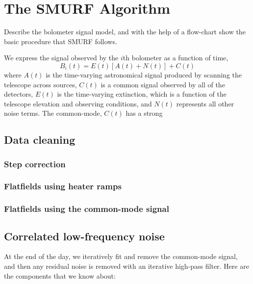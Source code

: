 \documentclass[useAMS,usenatbib,usegraphicx,nofootinbib]{mn2e}
\begin{document}
\section{The SMURF Algorithm}
\label{sec:data}

Describe the bolometer signal model, and with the help of a flow-chart
show the basic procedure that SMURF follows.

We express the signal observed by the $i$th bolometer as a function of time,
\begin{equation}
B_i(t) = E(t)[ A(t) + N(t) ] + C(t)
\end{equation}
where $A(t)$ is the time-varying astronomical signal produced by
scanning the telescope across sources, $C(t)$ is a common signal
observed by all of the detectors, $E(t)$ is the time-varying
extinction, which is a function of the telescope elevation and
observing conditions, and $N(t)$ represents all other noise terms. The
common-mode, $C(t)$ has a strong 

\subsection{Data cleaning}

\subsubsection{Step correction}

\subsubsection{Flatfields using heater ramps}

\subsubsection{Flatfields using the common-mode signal}



\subsection{Correlated low-frequency noise}
At the end of the day, we iteratively fit and remove the common-mode
signal, and then any residual noise is removed with an iterative
high-pass filter. Here are the components that we know about:
\end{document}
